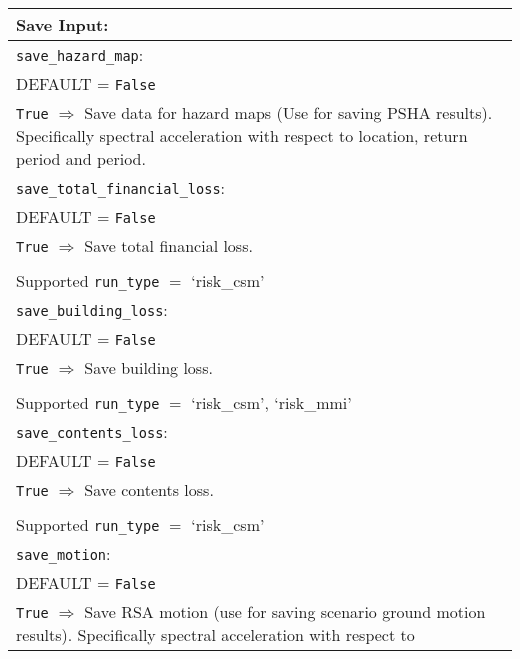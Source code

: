 \vspace{2em}
\begin{tabular}{|p{\textwidth}|}
\hline
\vspace{0.3em} \noindent \Large \textbf{Save Input:} \normalsize \\
\hline \vspace{0.1em} \texttt{save\_hazard\_map}: \\
DEFAULT = \texttt{False} \\
\texttt{True} $\Rightarrow$ Save data for hazard maps (Use for saving
PSHA results). Specifically spectral acceleration with respect to
location, return period and period.\\
\hline \vspace{0.1em} \texttt{save\_total\_financial\_loss}: \\
DEFAULT = \texttt{False} \\
\texttt{True} $\Rightarrow$ Save total financial loss. \\
\\
Supported \texttt{run\_type} $=$ `risk\_csm' \\
 \hline
\vspace{0.1em} \texttt{save\_building\_loss}: \\
DEFAULT = \texttt{False} \\
\texttt{True} $\Rightarrow$ Save building loss. \\
\\
Supported \texttt{run\_type} $=$ `risk\_csm', `risk\_mmi' \\
 \hline
\vspace{0.1em} \texttt{save\_contents\_loss}: \\
DEFAULT = \texttt{False} \\
 \texttt{True} $\Rightarrow$ Save contents loss. \\
 \\
Supported \texttt{run\_type} $=$ `risk\_csm' \\
\hline \vspace{0.1em} \texttt{save\_motion}: \\
DEFAULT = \texttt{False} \\
\texttt{True} $\Rightarrow$ Save RSA motion (use for saving scenario ground
motion results).  Specifically spectral acceleration with respect to

\end{tabular}
